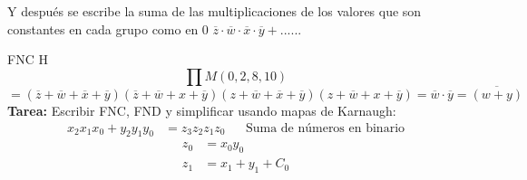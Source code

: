 \documentclass[12pt, twoside]{article}
\begin{document}
Y después se escribe la suma de las multiplicaciones de los valores que son constantes en cada grupo
como en $0$ $\overline{z}\cdot\overline{w}\cdot\overline{x}\cdot\overline{y}+ ......$

FNC H
{
	\Huge\[\prod M (0,2,8,10)\]
}
\[
	=(\overline{z}+\overline{w}+\overline{x}+\overline{y})
	(\overline{z}+\overline{w}+x+\overline{y})
	(z+\overline{w}+\overline{x}+\overline{y})
	(z+\overline{w}+x+\overline{y})
	=\overline{w}\cdot\overline{y}
	=\overline{(w+y)}
\]
\textbf{Tarea:}
Escribir FNC, FND y simplificar usando mapas de Karnaugh:
\begin{align*}
	x_2x_1x_0+y_2y_1y_0 &= z_3z_2z_1z_0 && \text{Suma de números en binario}
\end{align*}
\begin{align*}
	z_0 &= x_0 y_0\\
	z_1 &= x_1+y_1+C_0
\end{align*}
\end{document}
